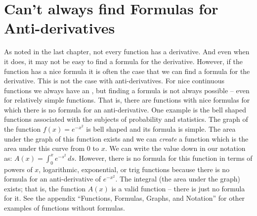 
\section{Can't always find Formulas for Anti-derivatives}
As noted in the last chapter, not every function has a derivative. And even when it does, it may not 
be easy to find a formula for the derivative. However, if the function has a nice formula it is often the 
case that we can find
a formula for the derivative. This is not the case with anti-derivatives. For nice continuous functions we always 
have an , but finding a formula is not always possible -- even for relatively simple functions. 
That is, there are functions with 
nice formulas for which there is no formula for an anti-derivative. One example is the bell shaped 
functions associated with the subjects of probability and statistics. 
The graph of the function $f(x) = e^{-x^2}$ is bell shaped and its formula is simple.
The area under the graph of this function exists and  we can {\it create\/} a function which is the area 
under this curve from $0$ to $x$.
We can write the value down in our notation as: $A(x) = \int_0^x e^{-s^2} \, ds$. 
However, there is no formula for this function in terms of powers of 
$x$, logarithmic, exponential, or trig functions because there is no formula for an anti-derivative of $e^{-x^2}$. 
The integral (the area under the graph)
exists; that is, the function $A(x)$ is a valid function -- there is just no formula for it. See the
appendix ``Functions, Formulas, Graphs, and Notation'' for other examples of functions without formulas.

